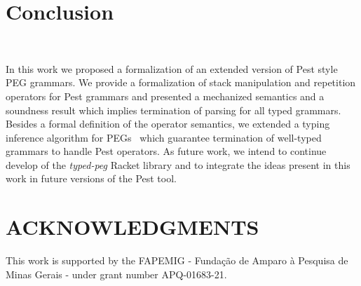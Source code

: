 \documentclass[preprint,12pt]{elsarticle}
\theoremstyle{definition}
\begin{document}
\section{Conclusion}~\label{sec:conclusion}

In this work we proposed a formalization of an extended version of Pest style PEG
grammars. We provide a formalization of stack manipulation and repetition operators
for Pest grammars and presented a mechanized semantics and a soundness result which
implies termination of parsing for all typed grammars.
Besides a formal definition of the operator semantics, we
extended a typing inference algorithm for PEGs~\cite{Cardoso23} which guarantee
termination of well-typed grammars to handle Pest operators.
As future work, we
intend to continue develop of the \emph{typed-peg} Racket library and to
integrate the ideas present in this work in future versions of the Pest tool.

\section*{ACKNOWLEDGMENTS}
This work is supported by the FAPEMIG - Fundação de Amparo à Pesquisa de Minas Gerais -
under grant number APQ-01683-21.






\end{document}
